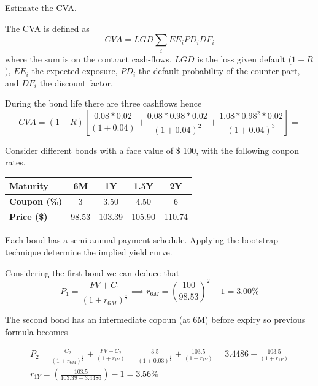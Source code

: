 \documentclass[12pt,a4paper]{exam}
\begin{document}
\begin{questions}
Estimate the CVA.
\fillwithlines{3cm}
\begin{solution}
The CVA is defined as 
\begin{equation*}
	CVA = LGD\sum_i EE_i PD_i DF_i
\end{equation*}
where the sum is on the contract cash-flows, $LGD$ is the loss given default ($1-R$), $EE_i$ the expected exposure, $PD_i$ the default probability of the counter-part, and $DF_i$ the discount factor.

During the bond life there are three cashflows hence
\begin{equation*}
	CVA = (1-R)\left[\frac{0.08*0.02}{(1+0.04)}+\frac{0.08*0.98*0.02}{(1+0.04)^2}+\frac{1.08*0.98^2*0.02}{(1+0.04)^3}\right]=
\end{equation*}
\end{solution}

\question
Consider different bonds with a face value of \$ 100, with the following coupon rates.

\begin{table}[h]
  \begin{center}
    \begin{tabular}{|l|c|c|c|c|}
      \hline
      \textbf{Maturity}    & 6M    & 1Y     & 1.5Y   & 2Y  \\ \hline
      \textbf{Coupon (\%)} & 3     & 3.50   & 4.50   & 6 \\ \hline
      \textbf{Price (\$)}  & 98.53 & 103.39 & 105.90 & 110.74 \\ \hline
    \end{tabular}
    \end{center}
  \end{table}
Each bond has a semi-annual payment schedule. Applying the bootstrap technique determine the implied yield curve.
\fillwithlines{3cm}
\begin{solution}
Considering the first bond we can deduce that
\begin{equation*}
  P_1 = \frac{FV + C_1}{(1+r_{6M})^{\frac{1}{2}}} \implies r_{6M} = \left(\frac{100}{98.53}\right)^{2} -1 = 3.00\%
\end{equation*}

The second bond has an intermediate copoun (at 6M) before expiry so previous formula becomes

\begin{equation*}
  \begin{gathered}
    P_2 =  \frac{C_2}{(1+r_{6M})^{\frac{1}{2}}} + \frac{FV + C_2}{(1+r_{1Y})} = \frac{3.5}{(1+0.03)^{\frac{1}{2}}} + \frac{103.5}{(1+r_{1Y})} = 3.4486 + \frac{103.5}{(1+r_{1Y})}\\
    r_{1Y} = \left(\frac{103.5}{103.39-3.4486}\right)-1 = 3.56\%
  \end{gathered}
\end{equation*}


\end{solution}
\end{questions}
\end{document}

